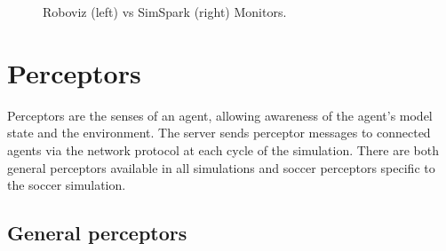\begin{figure}[!h] 
  \begin{center}
  \end{center}
  \caption{Roboviz (left) vs SimSpark (right) Monitors.}
  \label{fig:Roboviz}
\end{figure}





\section{Perceptors}
Perceptors are the senses of an agent, allowing awareness of the agent's model state and the environment.
The server sends perceptor messages to connected agents via the network protocol at each cycle of the simulation.
There are both general perceptors available in all simulations and soccer perceptors specific to the soccer simulation.



\subsection{General perceptors}

